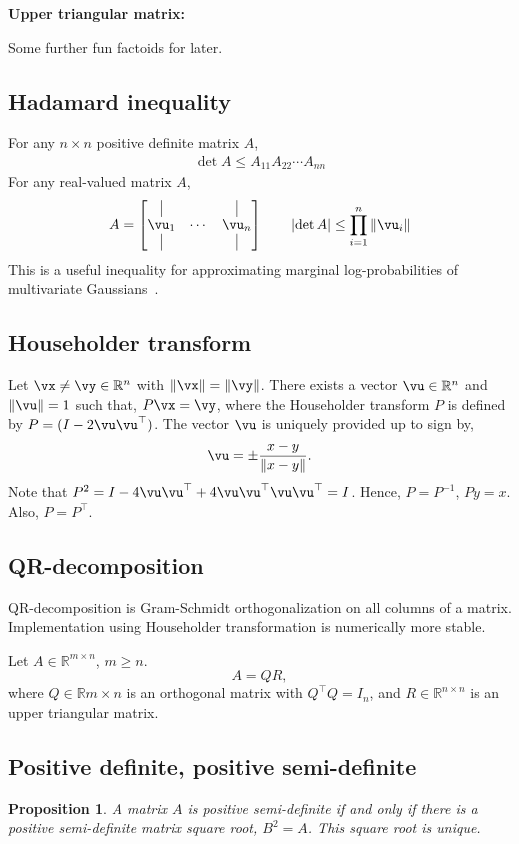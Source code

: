 \documentclass[a4paper,11pt]{exam}
\newtheorem{proposition}[theorem]{Proposition}
\newcounter{ct}
\newcommand{\inv}{^{-1}}
\newcommand{\tp}[1]{\ensuremath{{#1}^\top}} %
\newcommand{\norm}[1]{\ensuremath{\Vert{#1}\Vert}}
\providecommand{\abs}[1]{\lvert#1\rvert}
\newcommand{\field}[1]{\ensuremath{\mathbb{#1}}}
\newcommand{\reals}{\field{R}}
\begin{document}
\begin{questions}
\question \textbf{Upper triangular matrix:}


Some further fun factoids for later.
\subsection{Hadamard inequality}
For any $n \times n$ positive definite matrix $A$,
\begin{align}
    \det{A} \leq A_{11} A_{22} \cdots A_{nn}
\end{align}
For any real-valued matrix $A$,
\begin{align}
    A = 
    \begin{bmatrix}
	\kern.3em\vline\kern.3em
	&
	&
	\kern.3em\vline\kern.3em
	\\
	\vu_1 & \cdots & \vu_n \\
	\kern.3em\vline\kern.3em
	&
	&
	\kern.3em\vline\kern.3em
    \end{bmatrix}
    \qquad
    \abs{\det{A}} \leq \prod_{i=1}^n \norm{\vu_i}
\end{align}
This is a useful inequality for approximating marginal log-probabilities of multivariate Gaussians~\citep{Zhang2013a}.
\subsection{Householder transform}
Let $\vx \neq \vy \in \reals^n$ with $\norm{\vx} = \norm{\vy}$.
There exists a vector $\vu \in \reals^n$ and $\norm{\vu} = 1$ such that, $P\vx = \vy$,
where the Householder transform $P$ is defined by $P = (I - 2\vu\tp{\vu})$.
The vector $\vu$ is uniquely provided up to sign by,
\[
    \vu = \pm \frac{x-y}{\norm{x-y}}.
\]
Note that $P^2 = I - 4\vu\tp{\vu} + 4\vu\tp{\vu}\vu\tp{\vu} = I$.
Hence, $P = P\inv$, $Py = x$. Also, $P = \tp{P}$.

\subsection{QR-decomposition}
QR-decomposition is Gram-Schmidt orthogonalization on all columns of a matrix.
Implementation using Householder transformation is numerically more stable.

Let $A \in \reals^{m \times n}$, $m \geq n$.
\[
    A = QR,
\]
where $Q \in \reals{m \times n}$ is an orthogonal matrix with $\tp{Q}Q = I_n$,
and $R \in \reals^{n \times n}$ is an upper triangular matrix.

\subsection{Positive definite, positive semi-definite}
\begin{proposition}
    A matrix $A$ is positive semi-definite if and only if there is a positive semi-definite matrix square root, $B^2 = A$. This square root is unique.
\end{proposition}


\end{questions}
\end{document}
